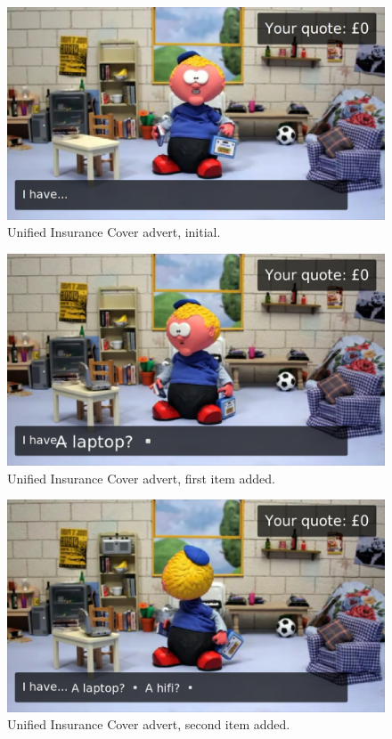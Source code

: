 	\begin{figure}[th]
		\centering
		\includegraphics[width=\textwidth,height=0.5\textheight,keepaspectratio]{images/adverts/unified_insurance_cover-1.png}
		\caption{Unified Insurance Cover advert, initial.}
		\label{fig:Paddy1}
	\end{figure}
	
	\begin{figure}[th]
		\centering
		\includegraphics[width=\textwidth,height=0.5\textheight,keepaspectratio]{images/adverts/unified_insurance_cover-2.png}
		\caption{Unified Insurance Cover advert, first item added.}
		\label{fig:Paddy2}
	\end{figure}
	
	\begin{figure}[th]
		\centering
		\includegraphics[width=\textwidth,height=0.5\textheight,keepaspectratio]{images/adverts/unified_insurance_cover-3.png}
		\caption{Unified Insurance Cover advert, second item added.}
		\label{fig:Paddy3}
	\end{figure}
	
